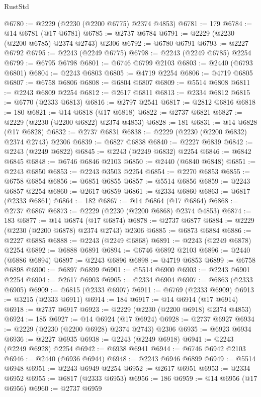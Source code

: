 \begin{lexlean}{RustStd}
\begin{coremodule}
{\begin{coremodule}
{{{{{{{{{{{{{{{{{{{{{{{{{{{{{{{{{{@6780 := @2229 (@2230 (@2200 @6775) @2374 @4853)
@6781 := 179
@6784 := @14 @6781 (@17 @6781)
@6785 := @2737 @6784
@6791 := @2229 (@2230 (@2200 @6785) @2374 @2743) @2306
@6792 := @6780 @6791
@6793 := @2227 @6792
@6795 := @2243 (@2249 @6775)
@6798 := @2243 (@2249 @6785) @2254
@6799 := @6795 @6798
@6801 := @6746 @6799 @2103
@6803 := @2440 (@6793 @6801)
@6804 := @2243 @6803
@6805 := @4719 @2254
@6806 := @4719 @6805
@6807 := @6758 @6806
@6808 := @6804 @6807
@6809 := @5514 @6808
@6811 := @2243 @6809 @2254
@6812 := @2617 @6811
@6813 := @2334 @6812
@6815 := @6770 (@2333 @6813)
@6816 := @2797 @2541
@6817 := @2812 @6816
@6818 := 180
@6821 := @14 @6818 (@17 @6818)
@6822 := @2737 @6821
@6827 := @2229 (@2230 (@2200 @6822) @2374 @4853)
@6828 := 181
@6831 := @14 @6828 (@17 @6828)
@6832 := @2737 @6831
@6838 := @2229 (@2230 (@2200 @6832) @2374 @2743) @2306
@6839 := @6827 @6838
@6840 := @2227 @6839
@6842 := @2243 (@2249 @6822)
@6845 := @2243 (@2249 @6832) @2254
@6846 := @6842 @6845
@6848 := @6746 @6846 @2103
@6850 := @2440 (@6840 @6848)
@6851 := @2243 @6850
@6853 := @2243 @3503 @2254
@6854 := @2270 @6853
@6855 := @6758 @6854
@6856 := @6851 @6855
@6857 := @5514 @6856
@6859 := @2243 @6857 @2254
@6860 := @2617 @6859
@6861 := @2334 @6860
@6863 := @6817 (@2333 @6861)
@6864 := 182
@6867 := @14 @6864 (@17 @6864)
@6868 := @2737 @6867
@6873 := @2229 (@2230 (@2200 @6868) @2374 @4853)
@6874 := 183
@6877 := @14 @6874 (@17 @6874)
@6878 := @2737 @6877
@6884 := @2229 (@2230 (@2200 @6878) @2374 @2743) @2306
@6885 := @6873 @6884
@6886 := @2227 @6885
@6888 := @2243 (@2249 @6868)
@6891 := @2243 (@2249 @6878) @2254
@6892 := @6888 @6891
@6894 := @6746 @6892 @2103
@6896 := @2440 (@6886 @6894)
@6897 := @2243 @6896
@6898 := @4719 @6853
@6899 := @6758 @6898
@6900 := @6897 @6899
@6901 := @5514 @6900
@6903 := @2243 @6901 @2254
@6904 := @2617 @6903
@6905 := @2334 @6904
@6907 := @6863 (@2333 @6905)
@6909 := @6815 (@2333 @6907)
@6911 := @6769 (@2333 @6909)
@6913 := @3215 (@2333 @6911)
@6914 := 184
@6917 := @14 @6914 (@17 @6914)
@6918 := @2737 @6917
@6923 := @2229 (@2230 (@2200 @6918) @2374 @4853)
@6924 := 185
@6927 := @14 @6924 (@17 @6924)
@6928 := @2737 @6927
@6934 := @2229 (@2230 (@2200 @6928) @2374 @2743) @2306
@6935 := @6923 @6934
@6936 := @2227 @6935
@6938 := @2243 (@2249 @6918)
@6941 := @2243 (@2249 @6928) @2254
@6942 := @6938 @6941
@6944 := @6746 @6942 @2103
@6946 := @2440 (@6936 @6944)
@6948 := @2243 @6946 @6899
@6949 := @5514 @6948
@6951 := @2243 @6949 @2254
@6952 := @2617 @6951
@6953 := @2334 @6952
@6955 := @6817 (@2333 @6953)
@6956 := 186
@6959 := @14 @6956 (@17 @6956)
@6960 := @2737 @6959
}}}}}}}}}}}}}}}}}}}}}}}}}}}}}}}}}}
\end{coremodule}}
\end{coremodule}
\end{lexlean}
